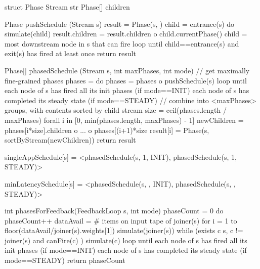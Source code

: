 struct Phase {
  Stream str
  Phase[] children
}

Phase pushSchedule (Stream s) {
  result = Phase(s, {})
  child = entrance(s)
  do {
    simulate(child)
    result.children = result.children o child.currentPhase()
    child = most downstream node in s that can fire
  } loop until child==entrance(s) and exit(s) has fired at least once
  return result
}

Phase[] phasedSchedule (Stream s, int maxPhases, int mode) {
  // get maximally fine-grained phases
  phases = {}
  do {
    phases = phases o pushSchedule(s)
  } loop until {each node of s has fired all its init phases    (if mode==INIT)
                each node of s has completed its steady state   (if mode==STEADY) }
  // combine into <maxPhases> groups, with contents sorted by child stream
  size = ceil(phases.length / maxPhases)
  forall i in [0, min(phases.length, maxPhases) - 1] {
    newChildren = phases[i*size].children o ... o phases[(i+1)*size
    result[i] = Phase(s, sortByStream(newChildren))
  }
  return result
}

singleAppSchedule[s]  = <phasedSchedule(s, 1, INIT),
                         phasedSchedule(s, 1, STEADY)>

minLatencySchedule[s] = <phasedSchedule(s, \infty, INIT), 
                         phasedSchedule(s, \infty, STEADY)>

int phasesForFeedback(FeedbackLoop s, int mode) {
  phaseCount = 0
  do {
    phaseCount++
    dataAvail = # items on input tape of joiner(s)
    for i = 1 to floor(dataAvail/joiner(s).weights[1])
      simulate(joiner(s))
    while (exists c \in s, c != joiner(s) and canFire(c) )
      simulate(c)
  } loop until {each node of s has fired all its init phases    (if mode==INIT)
                each node of s has completed its steady state   (if mode==STEADY) }
  return phaseCount
}

